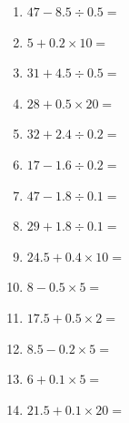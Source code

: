 \documentclass[12pt]{article}
\begin{document}
\begin{enumerate}
\item \large $ 47 - 8.5 \div 0.5 = $ \vspace{1.6cm}
\item \large $ 5 + 0.2 \times 10 = $ \vspace{1.6cm}
\item \large $ 31 + 4.5 \div 0.5 = $ \vspace{1.6cm}
\item \large $ 28 + 0.5 \times 20 = $ \vspace{1.6cm}
\newpage
\item \large $ 32 + 2.4 \div 0.2 = $ \vspace{1.6cm}
\item \large $ 17 - 1.6 \div 0.2 = $ \vspace{1.6cm}
\item \large $ 47 - 1.8 \div 0.1 = $ \vspace{1.6cm}
\item \large $ 29 + 1.8 \div 0.1 = $ \vspace{1.6cm}
\item \large $ 24.5 + 0.4 \times 10 = $ \vspace{1.6cm}
\item \large $ 8 - 0.5 \times 5 = $ \vspace{1.6cm}
\item \large $ 17.5 + 0.5 \times 2 = $ \vspace{1.6cm}
\item \large $ 8.5 - 0.2 \times 5 = $ \vspace{1.6cm}
\item \large $ 6 + 0.1 \times 5 = $ \vspace{1.6cm}
\item \large $ 21.5 + 0.1 \times 20 = $ \vspace{1.6cm}
\end{enumerate}
\newpage
\end{document}
